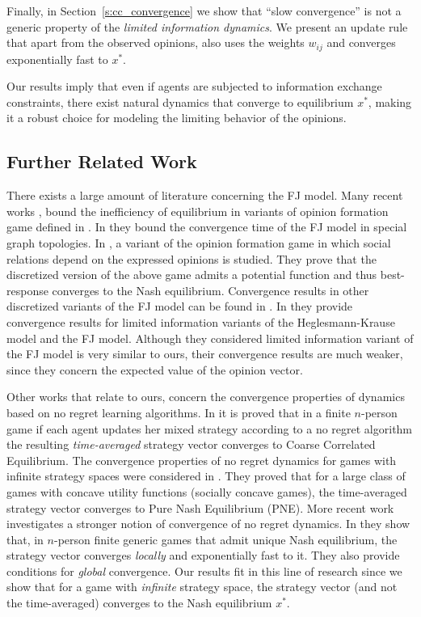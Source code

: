 Finally, in Section~\ref{s:cc_convergence} we show that \enquote{slow
  convergence} is not a generic property of the \emph{limited information
  dynamics}.  We present an update rule that apart from the observed opinions,
also uses the weights $w_{ij}$ and converges exponentially fast to $x^*$.


Our results imply that even if agents are subjected to information exchange
constraints, there exist natural dynamics that converge to equilibrium $x^*$,
making it a robust choice for modeling the limiting behavior of the opinions.


\subsection{Further Related Work}

There exists a large amount of literature concerning the FJ model.  Many recent
works \cite{BGM13,CKO13}, \cite{BFM16,EFHS17} bound the inefficiency of
equilibrium in variants of opinion formation game defined in \cite{BKO11}. In
\cite{GS14} they bound the convergence time of the FJ model in special graph
topologies.  In \cite{BFM16}, a variant of the opinion formation game in which
social relations depend on the expressed opinions is studied.  They prove that
the discretized version of the above game admits a potential function and thus
best-response converges to the Nash equilibrium.  Convergence results in other
discretized variants of the FJ model can be found in \cite{YOASS13,FGV16}. In
\cite{FPS16} they provide convergence results for limited information variants
of the Heglesmann-Krause model \cite{HK} and the FJ model. Although they
considered limited information variant of the FJ model is very similar to ours,
their convergence results are much weaker, since they concern the expected
value of the opinion vector.

Other works that relate to ours, concern the convergence properties of dynamics
based on no regret learning algorithms.  In \cite{FV97,FS99,SA00,SALS15} it is
proved that in a finite $n$-person game if each agent updates her mixed
strategy according to a no regret algorithm the resulting \emph{time-averaged}
strategy vector converges to Coarse Correlated Equilibrium. The convergence
properties of no regret dynamics for games with infinite strategy spaces were
considered in \cite{EMN09}.  They proved that for a large class of games with
concave utility functions (socially concave games), the time-averaged strategy
vector converges to Pure Nash Equilibrium (PNE). More recent work investigates
a stronger notion of convergence of no regret dynamics. In \cite{CHM17} they
show that, in $n$-person finite generic games that admit unique Nash
equilibrium, the strategy vector converges \emph{locally} and exponentially
fast to it. They also provide conditions for \emph{global} convergence.  Our
results fit in this line of research since we show that for a game with
\emph{infinite} strategy space, the strategy vector (and not the time-averaged)
converges to the Nash equilibrium $x^*$.

